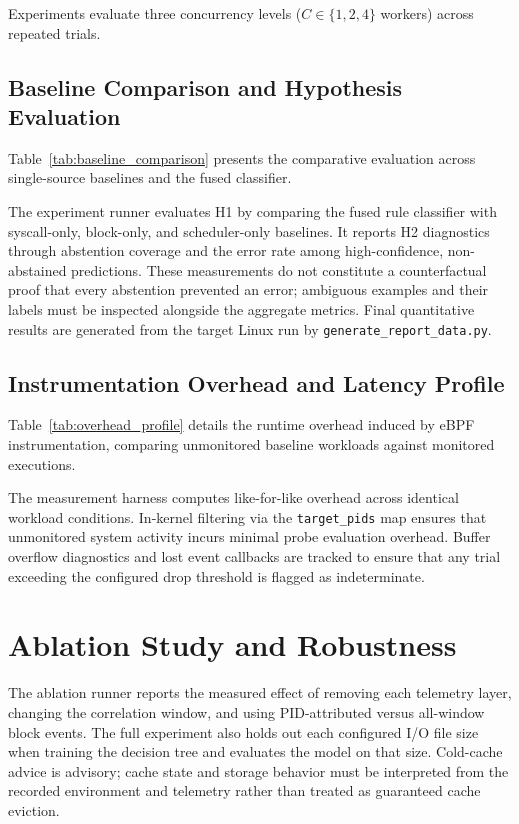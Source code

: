 \documentclass[conference]{IEEEtran}
\begin{document}
Experiments evaluate three concurrency levels ($C \in \{1, 2, 4\}$ workers) across repeated trials.

\subsection{Baseline Comparison and Hypothesis Evaluation}
Table~\ref{tab:baseline_comparison} presents the comparative evaluation across single-source baselines and the fused classifier.



The experiment runner evaluates H1 by comparing the fused rule classifier with syscall-only, block-only, and scheduler-only baselines. It reports H2 diagnostics through abstention coverage and the error rate among high-confidence, non-abstained predictions. These measurements do not constitute a counterfactual proof that every abstention prevented an error; ambiguous examples and their labels must be inspected alongside the aggregate metrics. Final quantitative results are generated from the target Linux run by \texttt{generate\_report\_data.py}.

\subsection{Instrumentation Overhead and Latency Profile}
Table~\ref{tab:overhead_profile} details the runtime overhead induced by eBPF instrumentation, comparing unmonitored baseline workloads against monitored executions.




The measurement harness computes like-for-like overhead across identical workload conditions. In-kernel filtering via the \texttt{target\_pids} map ensures that unmonitored system activity incurs minimal probe evaluation overhead. Buffer overflow diagnostics and lost event callbacks are tracked to ensure that any trial exceeding the configured drop threshold is flagged as indeterminate.

\section{Ablation Study and Robustness}
The ablation runner reports the measured effect of removing each telemetry layer, changing the correlation window, and using PID-attributed versus all-window block events. The full experiment also holds out each configured I/O file size when training the decision tree and evaluates the model on that size. Cold-cache advice is advisory; cache state and storage behavior must be interpreted from the recorded environment and telemetry rather than treated as guaranteed cache eviction.
\end{document}
